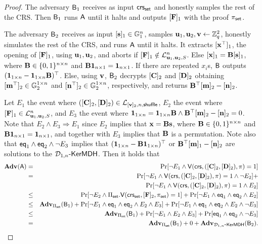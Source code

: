 \begin{proof}
The adversary $\mathsf{B}_1$ receives as input $\mathsf{crs}_{\mathsf{set}}$ and honestly samples the rest of the CRS. Then $\mathsf{B}_1$ runs $\mathsf{A}$ until it halts and outputs $[\mathbf{{F}}]_1$ with the proof $\pi_{\mathsf{set}}$.

The adversary $\mathsf{B}_2$ receives as input $[\mathbf{s}]_1\in\mathbb{G}_1^{n}$, samples $\mathbf{u}_1,\mathbf{u}_2,\mathbf{v}\gets \mathbb{Z}_q^2$, honestly simulates the rest of the CRS, and runs $\mathsf{A}$ until it halts. It extracts $[\mathbf{x}^\top]_1$, the opening of $[\mathbf{{F}}]_1$, using $\mathbf{u}_1,\mathbf{u}_2$, and aborts if $[\mathbf{{F}}]_1\notin\mathcal{L}_{\mathbf{u}_1,\mathbf{u}_2,S}^n$. Else $[\mathbf{x}]_1=\mathbf{{B}}[\mathbf{s}]_1$, where $\mathbf{{B}}\in\{0,1\}^{n\times n}$ and $\mathbf{{B}}\mathbf{{1}}_{n\times 1}=\mathbf{{1}}_{n\times 1}$. If there are repeated $x_i$s, $\mathsf{B}$ outputs $(\mathbf{{1}}_{1\times n}-\mathbf{{1}}_{1\times n}\mathbf{{B}})^\top$. Else, using $\mathbf{v}$, $\mathsf{B}_2$ decrypts $[\mathbf{{C}}]_2$ and $[\mathbf{{D}}]_2$ obtaining $[\mathbf{m}^\top]_2\in\mathbb{G}_2^{1\times n}$ and $[\mathbf{n}^\top]_2\in\mathbb{G}_2^{1\times n}$, respectively, and returns $\mathbf{{B}}^\top[\mathbf{m}]_2-[\mathbf{n}]_2$.

Let $E_1$ the event where $([\mathbf{{C}}]_2,[\mathbf{{D}}]_2)\in\mathcal{L}_{[\mathbf{v}]_2,n,\mathsf{shuffle}}$, $E_2$ the event where $[\mathbf{{F}}]_1\in\mathcal{L}_{\mathbf{u}_1,\mathbf{u}_2,S}^n$, and $E_3$ the event where $\mathbf{{1}}_{1\times n}=\mathbf{{1}}_{1\times n}\mathbf{{B}}\wedge\mathbf{{B}}^\top[\mathbf{m}]_2-[\mathbf{n}]_2=0$. Note that $E_2\wedge E_3\Longrightarrow E_1$ since $E_2$ implies that $\mathbf{x}=\mathbf{{B}}\mathbf{s}$, where $\mathbf{{B}}\in\{0,1\}^{n\times n}$ and $\mathbf{{B}}\mathbf{{1}}_{n\times 1}=\mathbf{{1}}_{n\times 1}$, and together with $E_3$ implies that $\mathbf{{B}}$ is a permutation. Note also that $\mathsf{eq}_1\wedge\mathsf{eq}_2\wedge\neg E_3$ implies that $(\mathbf{{1}}_{1\times n}-\mathbf{{B}}\mathbf{{1}}_{1\times n})^\top$ or $\mathbf{{B}}^\top[\mathbf{m}]_1-[\mathbf{n}]_2$ are solutions to the $\mathcal{D}_{1,n}\mbox{-}\mathsf{KerMDH}$. Then it holds that
\begin{eqnarray*}
\mathbf{Adv}(\mathsf{A}) & = &
    \Pr[\neg E_1 \wedge \mathsf{V}(\mathsf{crs},([\mathbf{{C}}]_2,[\mathbf{{D}}]_2),\pi)=1]\\
& = &
    \Pr[\neg E_1 \wedge \mathsf{V}(\mathsf{crs},([\mathbf{{C}}]_2,[\mathbf{{D}}]_2),\pi)=1 \wedge \neg E_2]+\\
& &
    \Pr[\neg E_1 \wedge \mathsf{V}(\mathsf{crs},([\mathbf{{C}}]_2,[\mathbf{{D}}]_2),\pi)=1 \wedge E_2]\\
& \leq &
    \Pr[\neg E_2 \wedge \Pi_{\mathsf{set}}.\mathsf{V}(\mathsf{crs}_{\mathsf{set}},[\mathbf{{F}}]_2,\pi_{\mathsf{set}})=1]+
    \Pr[\neg E_1 \wedge \mathsf{eq}_1 \wedge \mathsf{eq}_2 \wedge E_2]\\
& \leq &
    \mathbf{Adv}_{\Pi_{\mathsf{set}}}(\mathsf{B}_1)+\Pr[\neg E_1 \wedge \mathsf{eq}_1 \wedge \mathsf{eq}_2 \wedge E_2\wedge E_3] + \Pr[\neg E_1 \wedge \mathsf{eq}_1 \wedge \mathsf{eq}_2 \wedge E_2\wedge \neg E_3]\\
& \leq &
    \mathbf{Adv}_{\Pi_{\mathsf{set}}}(\mathsf{B}_1) + \Pr[\neg E_1\wedge E_2 \wedge E_3]+
    \Pr[\mathsf{eq}_1\wedge\mathsf{eq}_2\wedge\neg E_3]\\
& = &
    \mathbf{Adv}_{\Pi_{\mathsf{set}}}(\mathsf{B}_1)+0+\mathbf{Adv}_{\mathcal{D}_{1,n}\mbox{-}\mathsf{KerMDH}}(\mathsf{B}_2).
\end{eqnarray*} 
\end{proof}

